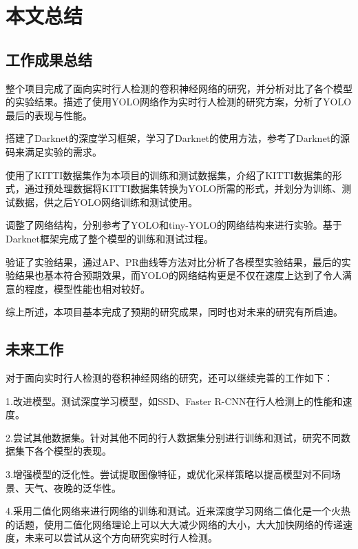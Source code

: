 \chapter{本文总结}

\section{工作成果总结}{
	整个项目完成了面向实时行人检测的卷积神经网络的研究，并分析对比了各个模型的实验结果。描述了使用YOLO网络作为实时行人检测的研究方案，分析了YOLO最后的表现与性能。

	搭建了Darknet的深度学习框架，学习了Darknet的使用方法，参考了Darknet的源码来满足实验的需求。

	使用了KITTI数据集作为本项目的训练和测试数据集，介绍了KITTI数据集的形式，通过预处理数据将KITTI数据集转换为YOLO所需的形式，并划分为训练、测试数据，供之后YOLO网络训练和测试使用。

	调整了网络结构，分别参考了YOLO和tiny-YOLO的网络结构来进行实验。基于Darknet框架完成了整个模型的训练和测试过程。

	验证了实验结果，通过AP、PR曲线等方法对比分析了各模型实验结果，最后的实验结果也基本符合预期效果，而YOLO的网络结构更是不仅在速度上达到了令人满意的程度，模型性能也相对较好。

	综上所述，本项目基本完成了预期的研究成果，同时也对未来的研究有所启迪。
}

\section{未来工作}{
	对于面向实时行人检测的卷积神经网络的研究，还可以继续完善的工作如下：

	1.改进模型。测试深度学习模型，如SSD、Faster R-CNN在行人检测上的性能和速度。

	2.尝试其他数据集。针对其他不同的行人数据集分别进行训练和测试，研究不同数据集下各个模型的表现。

	3.增强模型的泛化性。尝试提取图像特征，或优化采样策略以提高模型对不同场景、天气、夜晚的泛华性。

	4.采用二值化网络来进行网络的训练和测试。近来深度学习网络二值化是一个火热的话题，使用二值化网络理论上可以大大减少网络的大小，大大加快网络的传递速度，未来可以尝试从这个方向研究实时行人检测。
}

